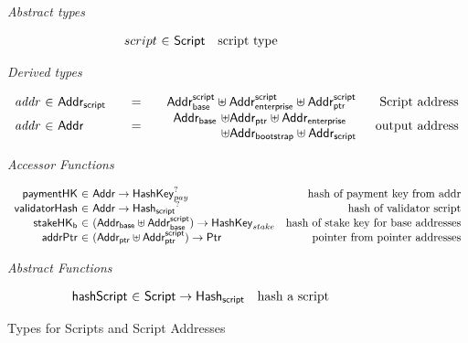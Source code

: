 \documentclass[11pt,a4paper,dvipsnames]{article}
\newcommand{\Addr}{\type{Addr}}
\newcommand{\AddrB}{\type{Addr_{base}}}
\newcommand{\AddrP}{\type{Addr_{ptr}}}
\newcommand{\AddrE}{\type{Addr_{enterprise}}}
\newcommand{\AddrBS}{\type{Addr_{bootstrap}}}
\newcommand{\AddrScr}{\type{Addr_{script}}}
\newcommand{\AddrScrBase}{\type{Addr_{base}^{script}}}
\newcommand{\AddrScrEnterprise}{\type{Addr_{enterprise}^{script}}}
\newcommand{\AddrScrPtr}{\type{Addr_{ptr}^{script}}}
\newcommand{\HashScr}{\type{Hash_{script}}}
\newcommand{\Ptr}{\type{Ptr}}
\newcommand{\Script}{\type{Script}}
\newcommand{\HashKey}{\type{HashKey}}
\theoremstyle{definition}
\begin{document}
\begin{figure*}[hbt]
  \emph{Abstract types}

  \begin{equation*}
    \begin{array}{r@{~\in~}lr}
      script & \Script & \text{script type}
    \end{array}
  \end{equation*}

  \emph{Derived types}

  \begin{equation*}
    \begin{array}{r@{~\in~}l@{\qquad=\qquad}lr}
      \var{addr} & \AddrScr & \AddrScrBase \uniondistinct \AddrScrEnterprise
                              \uniondistinct \AddrScrPtr & \text{Script address} \\
      \var{addr} & \Addr & \begin{array}{l@{~\uniondistinct}l}
                             \AddrB & \AddrP \uniondistinct \AddrE \\
                                    & \AddrBS \uniondistinct \AddrScr
                           \end{array}
                            & \text{output address}
    \end{array}
  \end{equation*}

  \emph{Accessor Functions}

  \begin{equation*}
    \begin{array}{r@{~\in~}lr}
      \fun{paymentHK} & \Addr \to \HashKey_{pay}^{?}
      & \text{hash of payment key from addr}\\
      \fun{validatorHash} & \Addr \to \HashScr^{?} & \text{hash of validator
                                                     script} \\
      \fun{stakeHK_{b}} & (\AddrB \uniondistinct \AddrScrBase) \to
                          \HashKey_{stake} & \text{hash of stake key for base
                                             addresses}\\
      \fun{addrPtr} & (\AddrP \uniondistinct \AddrScrPtr) \to \Ptr &
                                                                     \text{pointer
                                                                     from
                                                                     pointer addresses}
    \end{array}
  \end{equation*}

  \emph{Abstract Functions}

  \begin{equation*}
    \begin{array}{r@{~\in~}lr}
      \fun{hashScript} & \Script \to \HashScr & \text{hash a script}
    \end{array}
  \end{equation*}

  \caption{Types for Scripts and Script Addresses}
  \label{fig:types-scripts}
\end{figure*}
\end{document}
